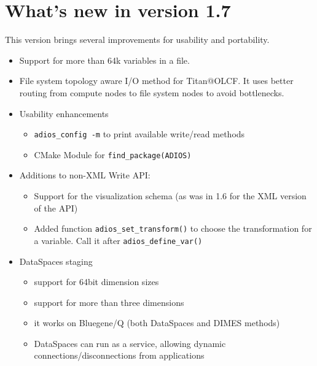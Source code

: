 \section {What's new in version 1.7}
This version brings several improvements for usability and portability. 
\begin{itemize}
\item Support for more than 64k variables in a file. 
\item File system topology aware I/O method for Titan@OLCF. It uses better routing from compute nodes to file system nodes to
           avoid bottlenecks. 
           
\item Usability enhancements
    \begin{itemize}
    \item \verb+adios_config -m+ to print available write/read methods
    \item CMake Module for \verb+find_package(ADIOS)+
    \end{itemize}
    
 \item Additions to non-XML Write API:
     \begin{itemize}
     \item Support for the visualization schema (as was in 1.6 for the XML version of the API)
     \item Added function \verb+adios_set_transform()+ to choose the transformation for a variable. Call it after \verb+adios_define_var()+
     \end{itemize}
            
\item DataSpaces staging
     \begin{itemize}
     \item support for 64bit dimension sizes
     \item support for more than three dimensions
     \item it works on Bluegene/Q (both DataSpaces and DIMES methods)
     \item DataSpaces can run as a service, allowing dynamic connections/disconnections from applications
     \end{itemize}
     
\end{itemize}

